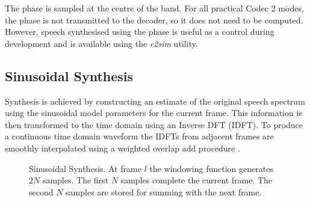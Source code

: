 \documentclass{article}
\begin{document}
{The phase is sampled at the centre of the band.  For all practical Codec 2 modes, the phase is not transmitted to the decoder, so it does not need to be computed.  However, speech synthesised using the phase is useful as a control during development and is available using the \emph{c2sim} utility.

\subsection{Sinusoidal Synthesis}

Synthesis is achieved by constructing an estimate of the original speech spectrum using the sinusoidal model parameters for the current frame. This information is then transformed to the time domain using an Inverse DFT (IDFT). To produce a continuous time domain waveform the IDFTs from adjacent frames are smoothly interpolated using a weighted overlap add procedure \cite{mcaulay1986speech}.

\begin{figure}[h]
\caption{Sinusoidal Synthesis.  At frame $l$ the windowing function generates $2N$ samples.  The first $N$ samples complete the current frame. The second $N$ samples are stored for summing with the next frame.}
\label{fig:synthesis}
\begin{center}
\end{center}
\end{figure}}
\end{document}

